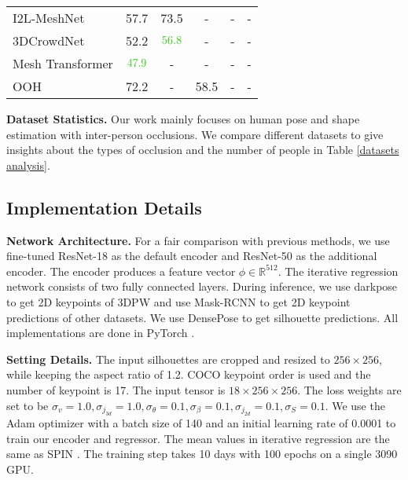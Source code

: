\documentclass[journal]{IEEEtran}
\begin{document}
\begin{table*}[htbp]
\begin{center}
\begin{tabular}{lccccc}
I2L-MeshNet \cite{Moon_2020_ECCV_I2L-MeshNet} & 57.7 & 73.5               & - & -               & -                 \\
3DCrowdNet \cite{choi20213dcrowdnet}  & 52.2 &  ${\color[HTML]{32CB16} 56.8}$             &- & -                & -               \\
Mesh Transformer \cite{lin2021end-to-end}  &${\color[HTML]{32CB16} 47.9}$ & -               & - & -                & -              \\
OOH\cite{zhang2020object}                          & 72.2                  & -                                   & 58.5               & -                                 & -                                  \\
\bottomrule
\end{tabular}


\label{table:total}
\end{center}
\end{table*}

\noindent\textbf{Dataset Statistics.} Our work mainly focuses on human pose and shape estimation with inter-person occlusions. We compare different datasets to give insights about the types of occlusion and the number of people in Table \ref{datasets analysis}.

\subsection{Implementation Details}
\noindent\textbf{Network Architecture.} For a fair comparison with previous methods, we use fine-tuned  ResNet-18 \cite{he2016deep} as the default encoder and ResNet-50 as the additional encoder. The encoder produces a feature vector $\phi \in \mathbb{R}^{512}$. The iterative regression network consists of two fully connected layers. During inference, we use darkpose \cite{Zhang_2020_CVPR} to get 2D keypoints of 3DPW and use Mask-RCNN \cite{he2017mask} to get 2D keypoint predictions of other datasets. We use DensePose \cite{guler2018densepose} to get silhouette predictions. All implementations are done in PyTorch \cite{paszke2019pytorch}. 


\noindent\textbf{Setting Details.} The input silhouettes are cropped and resized to $256\times256$, while keeping the aspect ratio of 1.2. COCO keypoint order is used and the number of keypoint is 17. The input tensor is $18\times256\times256$. The loss weights are set to be  $\sigma_{v}=1.0, \sigma_{j_{3d}}=1.0, \sigma_{\theta}=0.1, \sigma_{\beta}=0.1, \sigma_{j_{2d}}=0.1, \sigma_{S}=0.1$. We use the Adam optimizer \cite{kingma2014adam} with a batch size of 140 and an initial learning rate of 0.0001 to train our encoder and regressor. The mean values in iterative regression are the same as SPIN \cite{kolotouros2019spin}. The training step takes 10 days with 100 epochs on a single 3090 GPU.
\end{document}
